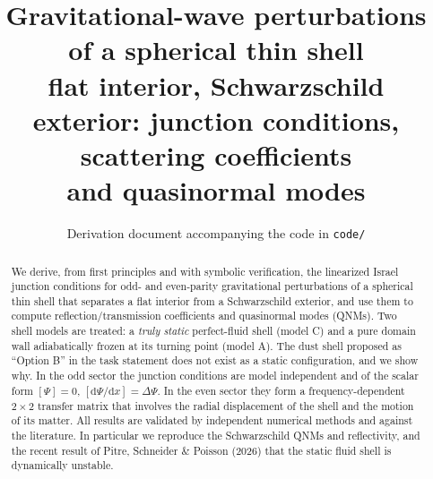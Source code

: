 \documentclass[11pt,a4paper]{article}
\title{Gravitational-wave perturbations of a spherical thin shell\\[2pt]
\large flat interior, Schwarzschild exterior: junction conditions, scattering coefficients\\ and quasinormal modes}
\author{Derivation document accompanying the code in \texttt{code/}}
\date{}
\numberwithin{equation}{section}
\newcommand{\dd}{\mathrm{d}}
\begin{document}
\maketitle

\begin{abstract}
We derive, from first principles and with symbolic verification, the linearized Israel junction
conditions for odd- and even-parity gravitational perturbations of a spherical thin shell that separates
a flat interior from a Schwarzschild exterior, and use them to compute reflection/transmission
coefficients and quasinormal modes (QNMs). Two shell models are treated: a \emph{truly static} perfect-fluid
shell (model C) and a pure domain wall adiabatically frozen at its turning point (model A). The dust
shell proposed as ``Option B'' in the task statement does not exist as a static configuration, and we
show why. In the odd sector the junction conditions are model independent and of the scalar form
$[\Psi]=0$, $[\dd\Psi/\dd x]=\Delta\Psi$. In the even sector they form a frequency-dependent $2\times2$ transfer
matrix that involves the radial displacement of the shell and the motion of its matter. All results are
validated by independent numerical methods and against the literature. In particular we reproduce the
Schwarzschild QNMs and reflectivity, and the recent result of Pitre, Schneider \& Poisson (2026) that the
static fluid shell is dynamically unstable.
\end{abstract}

\tableofcontents

\end{document}
